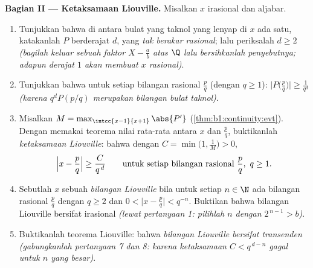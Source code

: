 \begin{problem}
\medskip
\noindent\textbf{Bagian II --- Ketaksamaan Liouville.} Misalkan $x$
irasional dan aljabar.
\begin{enumerate}[resume]
  \item Tunjukkan bahwa di antara  bulat yang taknol
        yang lenyap di $x$ ada satu, katakanlah $P$ berderajat $d$,
        yang \emph{tak berakar rasional}; lalu periksalah $d \geq 2$
        \emph{(bagilah keluar sebuah faktor $X - \frac ab$ atas $\Q$ lalu
        bersihkanlah penyebutnya; adapun derajat $1$ akan membuat $x$
        rasional)}.
  \item Tunjukkan bahwa untuk setiap bilangan rasional $\frac pq$ (dengan $q \geq 1$):
        $\bigl|P\bigl(\frac pq\bigr)\bigr| \geq \frac{1}{q^d}$
        \emph{(karena $q^d P(p/q)$ merupakan bilangan bulat taknol)}.
  \item Misalkan $M = \max_{\intcc{x-1}{x+1}} \abs{P'}$
        (\cref{thm:b1:continuity:evt}). Dengan memakai teorema nilai
        rata-rata antara $x$ dan $\frac pq$, buktikanlah
        \emph{ketaksamaan Liouville}: bahwa dengan $C = \min\bigl(1,
        \frac 1M\bigr) > 0$,
        \[
        \Bigl| x - \frac pq \Bigr| \geq \frac{C}{q^{\,d}}
        \qquad\text{untuk setiap bilangan rasional } \frac pq,\ q \geq 1 .
        \]
  \item Sebutlah $x$ sebuah \emph{bilangan Liouville} bila untuk setiap $n \in
        \N$ ada bilangan rasional $\frac pq$ dengan $q \geq 2$ dan
        $0 < \bigl|x - \frac pq\bigr| < q^{-n}$. Buktikan bahwa
        bilangan Liouville bersifat irasional \emph{(lewat pertanyaan 1: pilihlah
        $n$ dengan $2^{\,n-1} > b$)}.
  \item Buktikanlah teorema Liouville: bahwa \emph{bilangan Liouville bersifat
        transenden} \emph{(gabungkanlah pertanyaan 7 dan 8: karena
        ketaksamaan $C < q^{\,d-n}$ gagal untuk $n$ yang besar)}.
\end{enumerate}


\end{problem}
